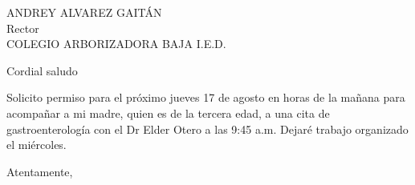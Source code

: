\documentclass[letterpaper,spanish]{letter}
\begin{document}
\begin{letter}{ANDREY ALVAREZ GAITÁN\\Rector\\COLEGIO ARBORIZADORA BAJA I.E.D.}
	
\opening{Cordial saludo}
Solicito permiso para el próximo jueves 17 de agosto en horas de la mañana para acompañar a mi madre, quien es de la tercera edad, a una cita de gastroenterología con el Dr Elder Otero a las 9:45 a.m. Dejaré trabajo organizado el miércoles.

\closing{Atentamente,}


\end{letter}
\end{document}
